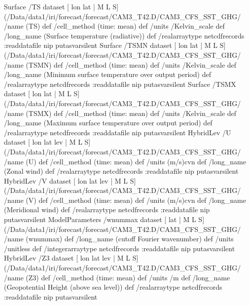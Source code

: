 \begin{ingrid}
Surface /TS{
dataset
[ lon lat | M L S] (/Data/data1/iri/forecast/forecast/CAM3_T42.D/CAM3_CFS_SST_GHG/%
/name (TS) def
 /cell_method (time: mean) def
 /units /Kelvin_scale def
 /long_name (Surface temperature (radiative)) def
 /realarraytype netcdfrecords :readdatafile
nip
}putasvarsilent
Surface /TSMN{
dataset
[ lon lat | M L S] (/Data/data1/iri/forecast/forecast/CAM3_T42.D/CAM3_CFS_SST_GHG/%
/name (TSMN) def
 /cell_method (time: mean) def
 /units /Kelvin_scale def
 /long_name (Minimum surface temperature over output period) def
 /realarraytype netcdfrecords :readdatafile
nip
}putasvarsilent
Surface /TSMX{
dataset
[ lon lat | M L S] (/Data/data1/iri/forecast/forecast/CAM3_T42.D/CAM3_CFS_SST_GHG/%
/name (TSMX) def
 /cell_method (time: mean) def
 /units /Kelvin_scale def
 /long_name (Maximum surface temperature over output period) def
 /realarraytype netcdfrecords :readdatafile
nip
}putasvarsilent
HybridLev /U{
dataset
[ lon lat lev | M L S] (/Data/data1/iri/forecast/forecast/CAM3_T42.D/CAM3_CFS_SST_GHG/%
/name (U) def
 /cell_method (time: mean) def
 /units (m/s)cvn def
 /long_name (Zonal wind) def
 /realarraytype netcdfrecords :readdatafile
nip
}putasvarsilent
HybridLev /V{
dataset
[ lon lat lev | M L S] (/Data/data1/iri/forecast/forecast/CAM3_T42.D/CAM3_CFS_SST_GHG/%
/name (V) def
 /cell_method (time: mean) def
 /units (m/s)cvn def
 /long_name (Meridional wind) def
 /realarraytype netcdfrecords :readdatafile
nip
}putasvarsilent
ModelParameters /wnummax{
dataset
[ lat | M L S] (/Data/data1/iri/forecast/forecast/CAM3_T42.D/CAM3_CFS_SST_GHG/%
/name (wnummax) def
 /long_name (cutoff Fourier wavenumber) def
 /units /unitless def
 /integerarraytype netcdfrecords :readdatafile
nip
}putasvarsilent
HybridLev /Z3{
dataset
[ lon lat lev | M L S] (/Data/data1/iri/forecast/forecast/CAM3_T42.D/CAM3_CFS_SST_GHG/%
/name (Z3) def
 /cell_method (time: mean) def
 /units /m def
 /long_name (Geopotential Height (above sea level)) def
 /realarraytype netcdfrecords :readdatafile
nip
}putasvarsilent


\end{ingrid}